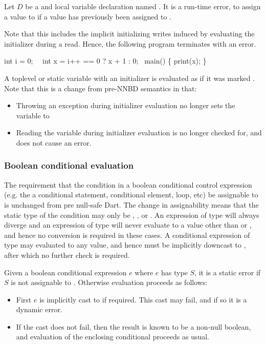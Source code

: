 \documentclass[makeidx]{article}
\begin{document}
{Let $D$ be a \LATE{} and \FINAL{} local variable declaration named .  It is a
run-time error, to assign a value to  if a value has previously
been assigned to .

Note that this includes the implicit initializing writes induced by
evaluating the initializer during a read.  Hence, the following program
terminates with an error.

\begin{dartCode}
int i = 0;
\LATE\ \FINAL\ int x = i++ == 0 ? x + 1 : 0;
\VOID\ main() \{
  print(x);
\}
\end{dartCode}

A toplevel or static variable with an initializer is evaluated as if it
was marked \LATE.  Note that this is a change from pre-NNBD semantics in that:

\begin{itemize}
\item Throwing an exception during initializer evaluation no longer sets the
  variable to 
\item Reading the variable during initializer evaluation is no longer checked for,
  and does not cause an error.
\end{itemize}

\subsubsection{Boolean conditional evaluation}

The requirement that the condition in a boolean conditional control expression
(e.g. the a conditional statement, conditional element,  loop, etc) be
assignable to  is unchanged from pre null-safe Dart.  The change in
assignability means that the static type of the condition may only be \DYNAMIC,
, or .  An expression of type  will
always diverge and an expression of type  will never evaluate to a value
other than  or , and hence no conversion is required in these
cases.  A conditional expression of type \DYNAMIC{} may evaluated to any value,
and hence must be implicitly downcast to , after which no further check is
required.

Given a boolean conditional expression $e$ where $e$ has type $S$, it is a
static error if $S$ is not assignable to .
Otherwise evaluation proceeds as follows:

\begin{itemize}
\item First $e$ is implicitly cast to  if required.
  This cast may fail, and if so it is a dynamic error.
\item If the cast does not fail, then the result is known to be a non-null
    boolean, and evaluation of the enclosing conditional proceeds as usual.
\end{itemize}

}
\end{document}
